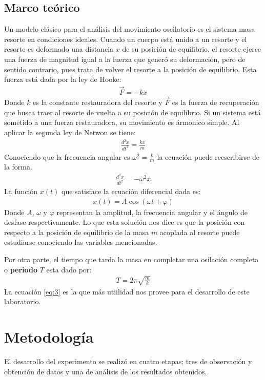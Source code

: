 \documentclass[spanish,notitlepage,letterpaper, 12pt]{article}
\begin{document}
\subsection{Marco teórico} \label{I.MT}
Un modelo clásico para el análisis del movimiento oscilatorio es el sistema masa resorte en condiciones ideales. Cuando un cuerpo está unido a un resorte y el resorte es deformado una distancia $x$ de su posición de equilibrio, el resorte ejerce una fuerza de magnitud igual a la fuerza que generó su deformación, pero de sentido contrario, pues trata de volver el resorte a la posición de equilibrio. Esta fuerza está dada por la ley de Hooke: 
\begin{align}\label{eq:1}
    \vec{F}=-kx
\end{align}
Donde $k$ es la constante restauradora del resorte y $\vec{F}$ es la fuerza de recuperación que busca traer al resorte de vuelta a su posición de equilibrio. Si un sistema está sometido a una fuerza restauradora, su movimiento es ármonico simple. Al aplicar la segunda ley de Netwon se tiene:
\begin{align}
    \frac{d^2x}{dt^2}=\frac{kx}{m}
\end{align}
Conociendo que la frecuencia angular es $\omega^2=\frac{k}{m}$ la ecuación puede reescribirse de la forma.
\begin{align}
    \frac{d^2x}{dt^2}=-\omega^2x
\end{align}
La función $x(t)$ que satisface la ecuación diferencial dada es: 
\begin{align}\label{eq:2}
    x(t)=A\cos{(\omega t + \varphi)}
\end{align}
Donde $A$, $\omega$ y $\varphi$ representan la amplitud, la frecuencia angular y el ángulo de desfase respectivamente. Lo que esta solución nos dice es que la posición con respecto a la posición de equilibrio de la masa $m$ acoplada al resorte puede estudiarse conociendo las variables
mencionadas.\par
\bigskip
Por otra parte, el tiempo que tarda la masa en completar una osilación completa o \textbf{periodo} $T$ esta dado por: 
\begin{align}
    \label{eq:3}
    T=2\pi\sqrt{\frac{m}{k}}
\end{align}
La ecuación \eqref{eq:3} es la que más utiilidad nos provee para el desarrollo de este laboratorio.
\section{Metodología}
El desarrollo del experimento se realizó en cuatro etapas; tres de observación y obtención de datos y una de análisis de los resultados obtenidos.
\end{document}
